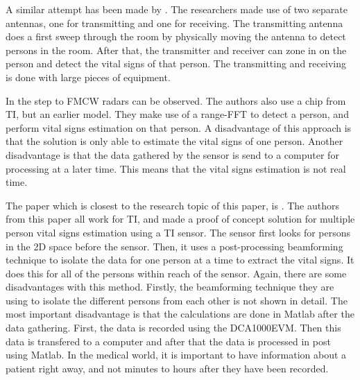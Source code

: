 A similar attempt has been made by \cite{yang2016monitoring}. The researchers made use of two separate antennas, one for transmitting and one for receiving. The transmitting antenna does a first sweep through the room by physically moving the antenna to detect persons in the room. After that, the transmitter and receiver can zone in on the person and detect the vital signs of that person. The transmitting and receiving is done with large pieces of equipment. 

In \cite{alizadeh2019remote} the step to FMCW radars can be observed. The authors also use a chip from TI, but an earlier model. They make use of a range-FFT to detect a person, and perform vital signs estimation on that person. A disadvantage of this approach is that the solution is only able to estimate the vital signs of one person. Another disadvantage is that the data gathered by the sensor is send to a computer for processing at a later time. This means that the vital signs estimation is not real time. 

The paper which is closest to the research topic of this paper, is \cite{ahmad2018vital}. The authors from this paper all work for TI, and made a proof of concept solution for multiple person vital signs estimation using a TI sensor. The sensor first looks for persons in the 2D space before the sensor. Then, it uses a post-processing beamforming technique to isolate the data for one person at a time to extract the vital signs. It does this for all of the persons within reach of the sensor. Again, there are some disadvantages with this method. Firstly, the beamforming technique they are using to isolate the different persons from each other is not shown in detail. The most important disadvantage is that the calculations are done in Matlab after the data gathering. First, the data is recorded using the DCA1000EVM. Then this data is transfered to a computer and after that the data is processed in post using Matlab. In the medical world, it is important to have information about a patient right away, and not minutes to hours after they have been recorded. 
